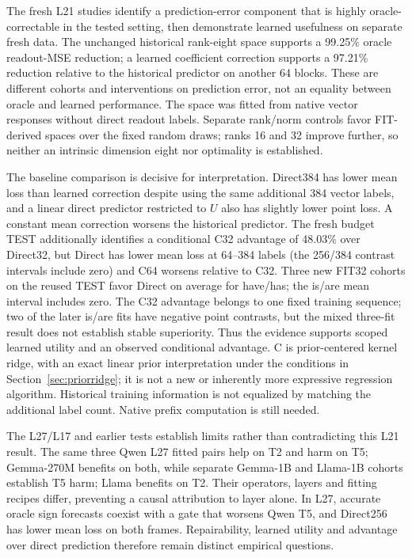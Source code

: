 The fresh L21 studies identify a prediction-error component that is highly oracle-correctable in the tested setting, then demonstrate learned usefulness on separate fresh data. The unchanged historical rank-eight space supports a 99.25\% oracle readout-MSE reduction; a learned coefficient correction supports a 97.21\% reduction relative to the historical predictor on another 64 blocks. These are different cohorts and interventions on prediction error, not an equality between oracle and learned performance. The space was fitted from native vector responses without direct readout labels. Separate rank/norm controls favor FIT-derived spaces over the fixed random draws; ranks 16 and 32 improve further, so neither an intrinsic dimension eight nor optimality is established.

The baseline comparison is decisive for interpretation. Direct384 has lower mean loss than learned correction despite using the same additional 384 vector labels, and a linear direct predictor restricted to $U$ also has slightly lower point loss. A constant mean correction worsens the historical predictor. The fresh budget TEST additionally identifies a conditional C32 advantage of 48.03\% over Direct32, but Direct has lower mean loss at 64--384 labels (the 256/384 contrast intervals include zero) and C64 worsens relative to C32. Three new FIT32 cohorts on the reused TEST favor Direct on average for have/has; the is/are mean interval includes zero. The C32 advantage belongs to one fixed training sequence; two of the later is/are fits have negative point contrasts, but the mixed three-fit result does not establish stable superiority. Thus the evidence supports scoped learned utility and an observed conditional advantage. C is prior-centered kernel ridge, with an exact linear prior interpretation under the conditions in Section~\ref{sec:priorridge}; it is not a new or inherently more expressive regression algorithm. Historical training information is not equalized by matching the additional label count. Native prefix computation is still needed.

The L27/L17 and earlier tests establish limits rather than contradicting this L21 result. The same three Qwen L27 fitted pairs help on T2 and harm on T5; Gemma-270M benefits on both, while separate Gemma-1B and Llama-1B cohorts establish T5 harm; Llama benefits on T2. Their operators, layers and fitting recipes differ, preventing a causal attribution to layer alone. In L27, accurate oracle sign forecasts coexist with a gate that worsens Qwen T5, and Direct256 has lower mean loss on both frames. Repairability, learned utility and advantage over direct prediction therefore remain distinct empirical questions.

